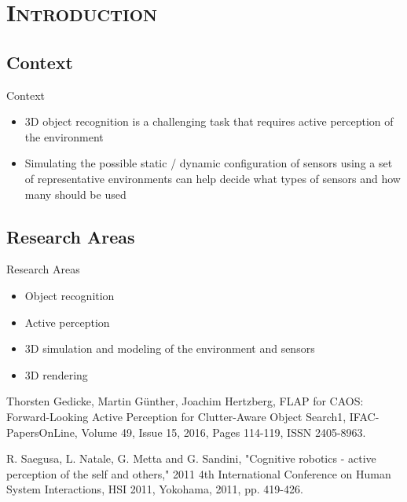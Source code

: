 \section{\scshape Introduction}\label{sec:introduction}

\subsection{Context}
\begin{frame}{Context}
	\begin{itemize}
		\item 3D object recognition is a challenging task that requires active perception of the environment
		\item Simulating the possible static / dynamic configuration of sensors using a set of representative environments can help decide what types of sensors and how many should be used
	\end{itemize}
\end{frame}


\subsection{Research Areas}
\begin{frame}{Research Areas}
	\begin{itemize}
		\item Object recognition
		\item Active perception
		\item 3D simulation and modeling of the environment and sensors
		\item 3D rendering
	\end{itemize}
	
	\begin{itemize}
		{\scriptsize \item Thorsten Gedicke, Martin Günther, Joachim Hertzberg, FLAP for CAOS: Forward-Looking Active Perception for Clutter-Aware Object Search1, IFAC-PapersOnLine, Volume 49, Issue 15, 2016, Pages 114-119, ISSN 2405-8963.}
		{\scriptsize \item R. Saegusa, L. Natale, G. Metta and G. Sandini, "Cognitive robotics - active perception of the self and others," 2011 4th International Conference on Human System Interactions, HSI 2011, Yokohama, 2011, pp. 419-426.}
	\end{itemize}
\end{frame}

